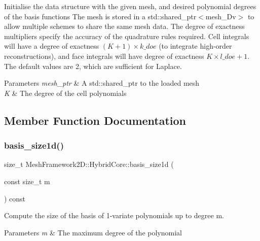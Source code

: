 Initialise the data structure with the given mesh, and desired polynomial degrees of the basis functions The mesh is stored in a {\ttfamily std\+::shared\+\_\+ptr$<$mesh\+\_\+Dv$>$} to allow multiple schemes to share the same mesh data. The degree of exactness multipliers specify the accuracy of the quadrature rules required. Cell integrals will have a degree of exactness $(K+1)\times k\_doe$ (to integrate high-\/order reconstructions), and face integrals will have degree of exactness $K\times l\_doe + 1$. The default values are 2, which are sufficient for Laplace. 
\begin{DoxyParams}{Parameters}
{\em mesh\+\_\+ptr} & A std\+::shared\+\_\+ptr to the loaded mesh \\
\hline
{\em K} & The degree of the cell polynomials \\
\hline
\end{DoxyParams}


\subsection{Member Function Documentation}
\mbox{\label{classMeshFramework2D_1_1HybridCore_a08aad1cf56ccfe043d98d3e665f68de3}} 
\subsubsection{\texorpdfstring{basis\+\_\+size1d()}{basis\_size1d()}}
{\footnotesize\ttfamily size\+\_\+t Mesh\+Framework2\+D\+::\+Hybrid\+Core\+::basis\+\_\+size1d (\begin{DoxyParamCaption}\item[{const size\+\_\+t}]{m }\end{DoxyParamCaption}) const}



Compute the size of the basis of 1-\/variate polynomials up to degree m. 


\begin{DoxyParams}{Parameters}
{\em m} & The maximum degree of the polynomial \\
\hline
\end{DoxyParams}
\mbox{\label{classMeshFramework2D_1_1HybridCore_a09aabd37f36e11bbcfffbb5bb59e54d2}} 
